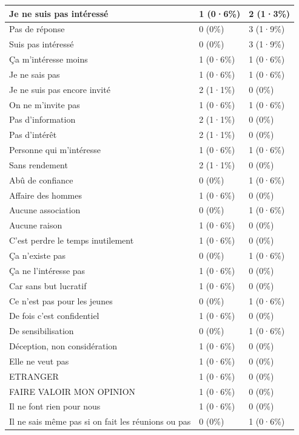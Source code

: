 \documentclass[
]{book}
\begin{document}
\begin{tabular}{l|l|l}
\hline
Je ne suis pas intéressé & 1 (0·6\%) & 2 (1·3\%)\\
\hline
Pas de réponse & 0 (0\%) & 3 (1·9\%)\\
\hline
Suis pas intéressé & 0 (0\%) & 3 (1·9\%)\\
\hline
Ça m'intéresse moins & 1 (0·6\%) & 1 (0·6\%)\\
\hline
Je ne sais pas & 1 (0·6\%) & 1 (0·6\%)\\
\hline
Je ne suis pas encore invité & 2 (1·1\%) & 0 (0\%)\\
\hline
On ne m'invite pas & 1 (0·6\%) & 1 (0·6\%)\\
\hline
Pas d'information & 2 (1·1\%) & 0 (0\%)\\
\hline
Pas d'intérêt & 2 (1·1\%) & 0 (0\%)\\
\hline
Personne qui m'intéresse & 1 (0·6\%) & 1 (0·6\%)\\
\hline
Sans rendement & 2 (1·1\%) & 0 (0\%)\\
\hline
Abû de confiance & 0 (0\%) & 1 (0·6\%)\\
\hline
Affaire des hommes & 1 (0·6\%) & 0 (0\%)\\
\hline
Aucune association & 0 (0\%) & 1 (0·6\%)\\
\hline
Aucune raison & 1 (0·6\%) & 0 (0\%)\\
\hline
C'est perdre le temps inutilement & 1 (0·6\%) & 0 (0\%)\\
\hline
Ça n'existe pas & 0 (0\%) & 1 (0·6\%)\\
\hline
Ça ne l'intéresse pas & 1 (0·6\%) & 0 (0\%)\\
\hline
Car sans but lucratif & 1 (0·6\%) & 0 (0\%)\\
\hline
Ce n'est pas pour les jeunes & 0 (0\%) & 1 (0·6\%)\\
\hline
De fois c'est confidentiel & 1 (0·6\%) & 0 (0\%)\\
\hline
De sensibilisation & 0 (0\%) & 1 (0·6\%)\\
\hline
Déception, non considération & 1 (0·6\%) & 0 (0\%)\\
\hline
Elle ne veut pas & 1 (0·6\%) & 0 (0\%)\\
\hline
ETRANGER & 1 (0·6\%) & 0 (0\%)\\
\hline
FAIRE VALOIR MON OPINION & 1 (0·6\%) & 0 (0\%)\\
\hline
Il ne font rien pour nous & 1 (0·6\%) & 0 (0\%)\\
\hline
Il ne sais même pas si on fait les réunions ou pas & 0 (0\%) & 1 (0·6\%)\\

\end{tabular}
\end{document}
